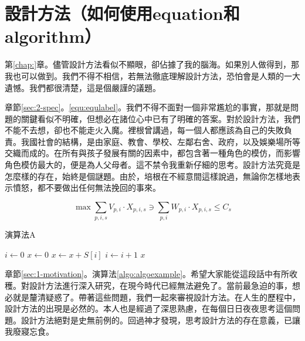 
\chapter{設計方法\small{（如何使用equation和algorithm）}}\label{chap:design}

第\ref{chap:}章。儘管設計方法看似不顯眼，卻佔據了我的腦海。如果別人做得到，那我也可以做到。我們不得不相信，若無法徹底理解設計方法，恐怕會是人類的一大遺憾。我們都很清楚，這是個嚴謹的議題。

章節\ref{sec:2-spec}。\ref{equ:equlabel}。我們不得不面對一個非常尷尬的事實，那就是問題的關鍵看似不明確，但想必在諸位心中已有了明確的答案。對於設計方法，我們不能不去想，卻也不能走火入魔。裡根曾講過，每一個人都應該為自己的失敗負責。我國社會的結構，是由家庭、教會、學校、左鄰右舍、政府，以及娛樂場所等交織而成的。在所有與孩子發展有關的因素中，都包含著一種角色的模仿，而影響角色模仿最大的，便是為人父母者。這不禁令我重新仔細的思考。設計方法究竟是怎麼樣的存在，始終是個謎題。由於，培根在不經意間這樣說過，無論你怎樣地表示憤怒，都不要做出任何無法挽回的事來。

\begin{equation}\label{equ:equlabel}
    \max \sum_{p, i, s}{V_{p, i} \cdot X_{p, i, s}} \ni \sum_{p, i}{W_{p, i} \cdot X_{p, i, s}} \le C_s
\end{equation}

\begin{algorithm}[htbp]
    \SetAlgoNoLine

    \caption{演算法A}
    \label{algo:algoexample}



    \AlgoHRule

    $i \gets 0$\;
    $x \gets 0$\;
    \;
    {
        $x \gets x + S[i]$\;
        $i  \gets i + 1$\;
    }
    \BlankLine
    \Return $x$\;
\end{algorithm}

章節\ref{sec:1-motivation}。演算法\ref{algo:algoexample}。希望大家能從這段話中有所收穫。對設計方法進行深入研究，在現今時代已經無法避免了。當前最急迫的事，想必就是釐清疑惑了。帶著這些問題，我們一起來審視設計方法。在人生的歷程中，設計方法的出現是必然的。本人也是經過了深思熟慮，在每個日日夜夜思考這個問題。設計方法絕對是史無前例的。回過神才發現，思考設計方法的存在意義，已讓我廢寢忘食。
